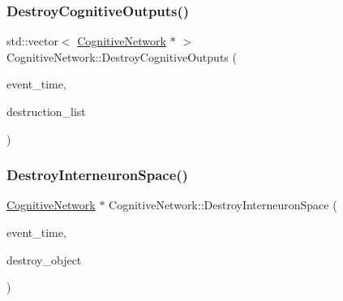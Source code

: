 \subsubsection{\texorpdfstring{Destroy\+Cognitive\+Outputs()}{DestroyCognitiveOutputs()}}
{\footnotesize\ttfamily std\+::vector$<$ \mbox{\hyperlink{classCognitiveNetwork}{Cognitive\+Network}} $\ast$ $>$ Cognitive\+Network\+::\+Destroy\+Cognitive\+Outputs (\begin{DoxyParamCaption}\item[{std\+::chrono\+::time\+\_\+point$<$ \mbox{\hyperlink{universe_8h_a0ef8d951d1ca5ab3cfaf7ab4c7a6fd80}{Clock}} $>$}]{event\+\_\+time,  }\item[{std\+::vector$<$ \mbox{\hyperlink{classCognitiveNetwork}{Cognitive\+Network}} $\ast$$>$}]{destruction\+\_\+list }\end{DoxyParamCaption})}

\mbox{\label{classCognitiveNetwork_acdda154177d3b3a92885c10f6b3dc274}} 
\subsubsection{\texorpdfstring{Destroy\+Interneuron\+Space()}{DestroyInterneuronSpace()}}
{\footnotesize\ttfamily \mbox{\hyperlink{classCognitiveNetwork}{Cognitive\+Network}} $\ast$ Cognitive\+Network\+::\+Destroy\+Interneuron\+Space (\begin{DoxyParamCaption}\item[{std\+::chrono\+::time\+\_\+point$<$ \mbox{\hyperlink{universe_8h_a0ef8d951d1ca5ab3cfaf7ab4c7a6fd80}{Clock}} $>$}]{event\+\_\+time,  }\item[{\mbox{\hyperlink{classCognitiveNetwork}{Cognitive\+Network}} $\ast$}]{destroy\+\_\+object }\end{DoxyParamCaption})}

\mbox{\label{classCognitiveNetwork_a718833496332e0471186c9a886005c4a}} 
